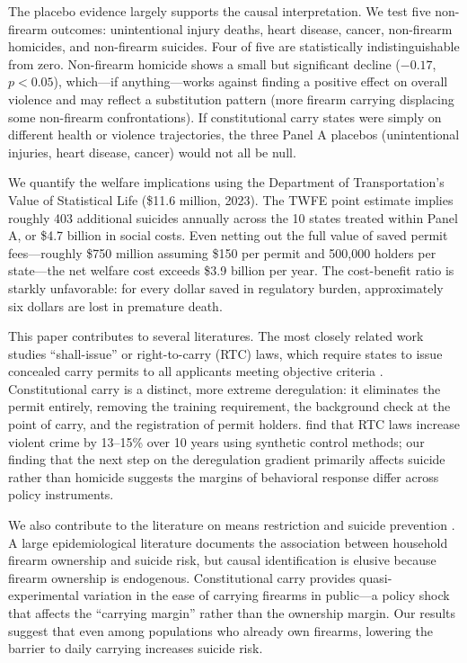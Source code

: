 \documentclass[12pt]{article}
\begin{document}
The placebo evidence largely supports the causal interpretation. We test five non-firearm outcomes: unintentional injury deaths, heart disease, cancer, non-firearm homicides, and non-firearm suicides. Four of five are statistically indistinguishable from zero. Non-firearm homicide shows a small but significant decline ($-0.17$, $p < 0.05$), which---if anything---works against finding a positive effect on overall violence and may reflect a substitution pattern (more firearm carrying displacing some non-firearm confrontations). If constitutional carry states were simply on different health or violence trajectories, the three Panel A placebos (unintentional injuries, heart disease, cancer) would not all be null.

We quantify the welfare implications using the Department of Transportation's Value of Statistical Life (\$11.6 million, 2023). The TWFE point estimate implies roughly 403 additional suicides annually across the 10 states treated within Panel A, or \$4.7 billion in social costs. Even netting out the full value of saved permit fees---roughly \$750 million assuming \$150 per permit and 500,000 holders per state---the net welfare cost exceeds \$3.9 billion per year. The cost-benefit ratio is starkly unfavorable: for every dollar saved in regulatory burden, approximately six dollars are lost in premature death.

This paper contributes to several literatures. The most closely related work studies ``shall-issue'' or right-to-carry (RTC) laws, which require states to issue concealed carry permits to all applicants meeting objective criteria \citep{donohue2019right, aneja2014impact}. Constitutional carry is a distinct, more extreme deregulation: it eliminates the permit entirely, removing the training requirement, the background check at the point of carry, and the registration of permit holders. \citet{donohue2019right} find that RTC laws increase violent crime by 13--15\% over 10 years using synthetic control methods; our finding that the next step on the deregulation gradient primarily affects suicide rather than homicide suggests the margins of behavioral response differ across policy instruments.

We also contribute to the literature on means restriction and suicide prevention \citep{miller2012firearms, anestis2017rising, anglemyer2014accessibility}. A large epidemiological literature documents the association between household firearm ownership and suicide risk, but causal identification is elusive because firearm ownership is endogenous. Constitutional carry provides quasi-experimental variation in the ease of carrying firearms in public---a policy shock that affects the ``carrying margin'' rather than the ownership margin. Our results suggest that even among populations who already own firearms, lowering the barrier to daily carrying increases suicide risk.
\end{document}
